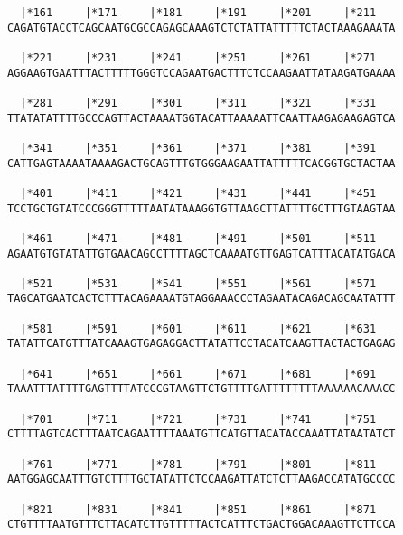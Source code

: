 \documentclass{article}
\begin{document}
\begin{Verbatim}
  |*161     |*171     |*181     |*191     |*201     |*211   
CAGATGTACCTCAGCAATGCGCCAGAGCAAAGTCTCTATTATTTTTCTACTAAAGAAATA
                                                            
  |*221     |*231     |*241     |*251     |*261     |*271   
AGGAAGTGAATTTACTTTTTGGGTCCAGAATGACTTTCTCCAAGAATTATAAGATGAAAA
                                                            
  |*281     |*291     |*301     |*311     |*321     |*331   
TTATATATTTTGCCCAGTTACTAAAATGGTACATTAAAAATTCAATTAAGAGAAGAGTCA
                                                            
  |*341     |*351     |*361     |*371     |*381     |*391   
CATTGAGTAAAATAAAAGACTGCAGTTTGTGGGAAGAATTATTTTTCACGGTGCTACTAA
                                                            
  |*401     |*411     |*421     |*431     |*441     |*451   
TCCTGCTGTATCCCGGGTTTTTAATATAAAGGTGTTAAGCTTATTTTGCTTTGTAAGTAA
                                                            
  |*461     |*471     |*481     |*491     |*501     |*511   
AGAATGTGTATATTGTGAACAGCCTTTTAGCTCAAAATGTTGAGTCATTTACATATGACA
                                                            
  |*521     |*531     |*541     |*551     |*561     |*571   
TAGCATGAATCACTCTTTACAGAAAATGTAGGAAACCCTAGAATACAGACAGCAATATTT
                                                            
  |*581     |*591     |*601     |*611     |*621     |*631   
TATATTCATGTTTATCAAAGTGAGAGGACTTATATTCCTACATCAAGTTACTACTGAGAG
                                                            
  |*641     |*651     |*661     |*671     |*681     |*691   
TAAATTTATTTTGAGTTTTATCCCGTAAGTTCTGTTTTGATTTTTTTTAAAAAACAAACC
                                                            
  |*701     |*711     |*721     |*731     |*741     |*751   
CTTTTAGTCACTTTAATCAGAATTTTAAATGTTCATGTTACATACCAAATTATAATATCT
                                                            
  |*761     |*771     |*781     |*791     |*801     |*811   
AATGGAGCAATTTGTCTTTTGCTATATTCTCCAAGATTATCTCTTAAGACCATATGCCCC
                                                            
  |*821     |*831     |*841     |*851     |*861     |*871   
CTGTTTTAATGTTTCTTACATCTTGTTTTTACTCATTTCTGACTGGACAAAGTTCTTCCA
                                                            

\end{Verbatim}
\end{document}
